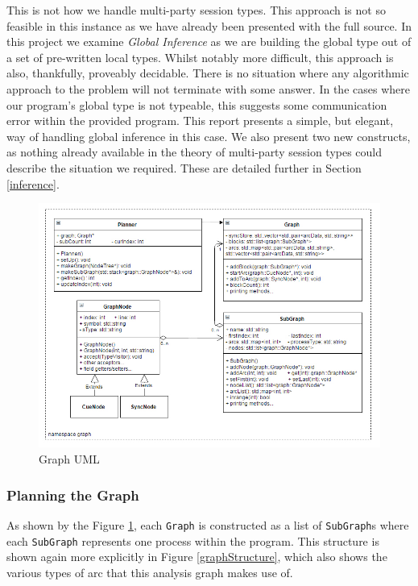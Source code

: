 \documentclass[11pt, abstracton, twoside, titlepage=true]{scrartcl}
\begin{document}
This is not how we handle multi-party session types. This approach is not so feasible 
in this instance as we have already been presented with the full source. In this 
project we examine \emph{Global Inference} as we are building the global type out of 
a set of pre-written local types. Whilst notably more
difficult, this approach is also, thankfully, proveably decidable. There is
no situation where any algorithmic approach to the problem will not terminate
with some answer. In the cases where our program's global type is not
typeable, this suggests some communication error within the provided program. 
This report presents a simple, but elegant, way of handling global inference in this 
case. We also present two new constructs, as nothing already available in the theory 
of multi-party session types could describe the situation we required. These are 
detailed further in Section \ref{inference}.

\begin{figure}[h!]
	\centering
	\includegraphics[width=\textwidth]{images/session.jpg}
	\caption{Graph UML} \label{graphUML}
\end{figure}
\newpage

\subsubsection{Planning the Graph} \label{planningGraph}
As shown by the Figure \ref{graphUML}, each \texttt{Graph} is constructed as
a list of \texttt{SubGraph}s where each \texttt{SubGraph} represents
one process within the program. This structure is shown again more explicitly in 
Figure \ref{graphStructure}, which also shows the various types of arc that this 
analysis graph makes use of.
\end{document}
